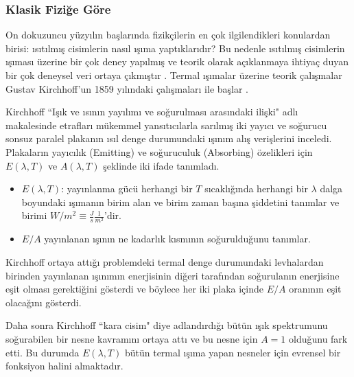 \documentclass[a4paper,12pt, twoside]{article}
\begin{document}


\subsubsection{Klasik Fiziğe Göre}
On dokuzuncu yüzyılın başlarında fizikçilerin en çok ilgilendikleri konulardan birisi:
ısıtılmış cisimlerin nasıl ışıma yaptıklarıdır? Bu nedenle ısıtılmış cisimlerin ışıması üzerine bir çok deney yapılmış ve teorik olarak açıklanmaya ihtiyaç duyan bir çok deneysel veri ortaya çıkmıştır \cite{book:Sharkov}. Termal ışımalar üzerine teorik çalışmalar Gustav Kirchhoff'un 1859 yılındaki çalışmaları ile başlar \cite{book:Gasiorowicz}. 

Kirchhoff ``Işık ve ısının yayılımı ve soğurulması arasındaki ilişki" \cite{book:Jammer, Kirchhoff1859} adlı makalesinde etrafları mükemmel yansıtıcılarla sarılmış iki yayıcı ve soğurucu sonsuz paralel plakanın ısıl denge durumundaki ışınım alış verişlerini inceledi. Plakaların yayıcılık (Emitting) ve soğuruculuk (Absorbing) özelikleri için $E(\lambda, T)$ ve $A(\lambda, T)$ şeklinde iki ifade tanımladı. 

\begin{itemize}
\item $E(\lambda, T)$: yayınlanma gücü herhangi bir $T$ sıcaklığında  herhangi bir $\lambda$ dalga boyundaki ışımanın birim alan ve birim zaman başına şiddetini tanımlar ve birimi $W/m^2\equiv \frac{J}{s} \frac{1}{m^2}$'dir.
\item $E/A$ yayınlanan ışının ne kadarlık kısmının soğurulduğunu tanımlar.
\end{itemize}

Kirchhoff ortaya attığı problemdeki termal denge durumundaki levhalardan birinden yayınlanan ışınımın enerjisinin diğeri tarafından soğurulanın enerjisine eşit olması gerektiğini gösterdi ve böylece her iki plaka içinde $E/A$ oranının eşit olacağını gösterdi.

Daha sonra Kirchhoff ``kara cisim" diye adlandırdığı bütün ışık spektrumunu soğurabilen bir nesne kavramını ortaya attı ve bu nesne için $A=1$ olduğunu fark etti. Bu durumda $E(\lambda, T)$ bütün termal ışıma yapan nesneler için evrensel bir fonksiyon halini almaktadır.
\end{document}
